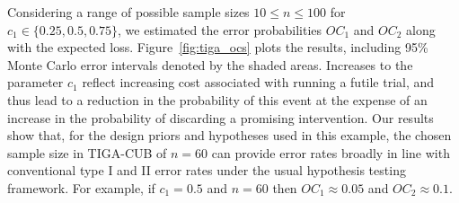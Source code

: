 \documentclass[AMA,STIX1COL]{WileyNJD-v2}
\begin{document}
Considering a range of possible sample sizes $10 \leq n \leq 100$ for $c_1 \in \{0.25, 0.5, 0.75\}$, we estimated the error probabilities $OC_1$ and $OC_2$ along with the expected loss. Figure~\ref{fig:tiga_ocs} plots the results, including 95\% Monte Carlo error intervals denoted by the shaded areas. Increases to the parameter $c_1$ reflect increasing cost associated with running a futile trial, and thus lead to a reduction in the probability of this event at the expense of an increase in the probability of discarding a promising intervention. Our results show that, for the design priors and hypotheses used in this example, the chosen sample size in TIGA-CUB of $n=60$ can provide error rates broadly in line with conventional type I and II error rates under the usual hypothesis testing framework. For example, if $c_1=0.5$ and $n=60$ then $OC_1 \approx 0.05$ and $OC_2 \approx 0.1$.
\end{document}
